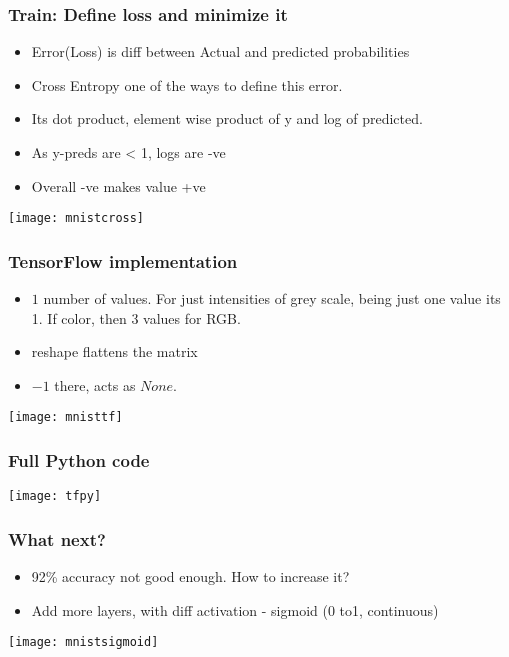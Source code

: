\begin{frame}[fragile] \frametitle{Train: Define loss and minimize it}

\begin{itemize}
\item Error(Loss) is diff between Actual and predicted probabilities
\item Cross Entropy one of the ways to define this error.
\item Its dot product, element wise product of y and log of predicted.
\item As y-preds are < 1, logs are -ve
\item Overall -ve makes value +ve
\end{itemize}
\begin{center}
\texttt{[image: mnistcross]}
\end{center}
\end{frame}


\begin{frame}[fragile] \frametitle{TensorFlow implementation}

\begin{itemize}
\item $1$ number of values. For just intensities of grey scale, being just one value its 1. If color, then 3 values for RGB.
\item reshape flattens the matrix
\item $-1$ there, acts as $None$.
\end{itemize}
\begin{center}
\texttt{[image: mnisttf]}
\end{center}
\end{frame}

\begin{frame}[fragile] \frametitle{Full Python code}
\begin{center}
\texttt{[image: tfpy]}
\end{center}
\end{frame}

\begin{frame}[fragile] \frametitle{What next?}

\begin{itemize}
\item 92\% accuracy not good enough. How to increase it?
\item Add more layers, with diff activation - sigmoid (0 to1, continuous)
\end{itemize}
\begin{center}
\texttt{[image: mnistsigmoid]}
\end{center}
\end{frame}


